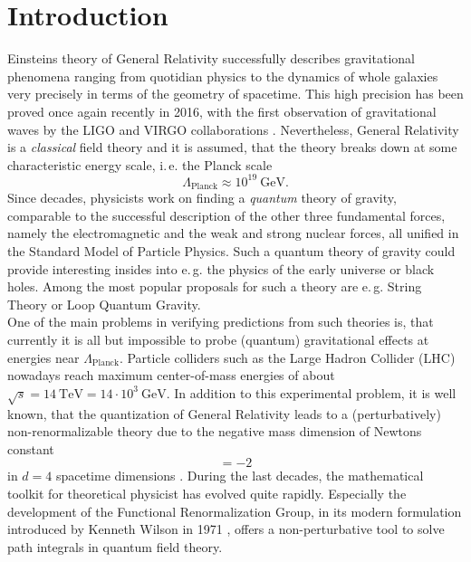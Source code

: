 \chapter{Introduction}
Einsteins theory of General Relativity successfully describes gravitational phenomena ranging from quotidian physics to the dynamics of whole galaxies very precisely in terms of the geometry of spacetime. This high precision has been proved once again recently in 2016, with the first observation of gravitational waves by the LIGO and VIRGO collaborations \cite{LIGO2016}. Nevertheless, General Relativity is a \textit{classical} field theory and it is assumed, that the theory breaks down at some characteristic energy scale, i.\,e. the Planck scale
\begin{equation*}
	\Lambda_{\text{Planck}} \approx 10^{19} \ \text{GeV}. 
\end{equation*}
Since decades, physicists work on finding a \textit{quantum} theory of gravity, comparable to the successful description of the other three fundamental forces, namely the electromagnetic and the weak and strong nuclear forces, all unified in the Standard Model of Particle Physics. Such a quantum theory of gravity could provide interesting insides into e.\,g. the physics of the early universe or black holes. Among the most popular proposals for such a theory are e.\,g. String Theory or Loop Quantum Gravity. \\
 One of the main problems in verifying predictions from such theories is, that currently it is all but impossible to probe (quantum) gravitational effects at energies near $\Lambda_{\text{Planck}}$. Particle colliders such as the Large Hadron Collider (LHC) nowadays reach maximum center-of-mass energies of about $\sqrt{s} = 14 \ \text{TeV} = 14\cdot 10^3 \ \text{GeV}$. In addition to this experimental problem, it is well known, that the quantization of General Relativity leads to a (perturbatively) non-renormalizable theory  due to the negative mass dimension of Newtons constant
\begin{equation*}
	[G] = -2  
\end{equation*}
in $d=4$ spacetime dimensions \cite{GoroffSanotti1985, tHooftVeltmann1974}. During the last decades, the mathematical toolkit for theoretical physicist has evolved quite rapidly. Especially the development of the Functional Renormalization Group, in its modern formulation introduced by Kenneth Wilson in 1971 \cite{Wilson1971}, offers a non-perturbative tool to solve path integrals in quantum field theory. \\
